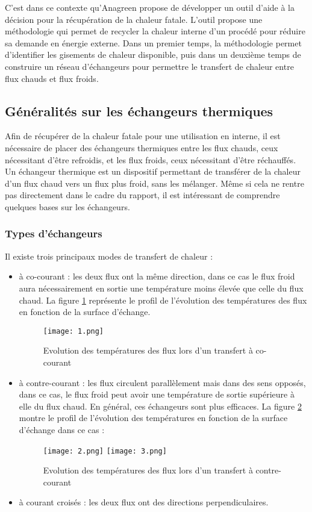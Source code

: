 C'est dans ce contexte qu'Anagreen propose de développer un outil d'aide à la décision pour la récupération de la chaleur fatale. L'outil propose une méthodologie qui permet de recycler la chaleur interne d'un procédé pour réduire sa demande en énergie externe. Dans un premier temps, la méthodologie permet d'identifier les gisements de chaleur disponible, puis dans un deuxième temps de construire un réseau d'échangeurs pour permettre le transfert de chaleur entre flux chauds et flux froids.

\subsection{Généralités sur les échangeurs thermiques}
Afin de récupérer de la chaleur fatale pour une utilisation en interne, il est nécessaire de
placer des échangeurs thermiques entre les flux chauds, ceux nécessitant d'être refroidis, et les flux froids, ceux nécessitant d'être réchauffés.
Un échangeur thermique est un dispositif permettant de transférer de la chaleur d'un flux chaud vers un flux plus froid, sans les mélanger. Même si cela ne rentre pas directement dans le cadre du rapport, il est intéressant de comprendre quelques bases sur les échangeurs.

\subsubsection{Types d'échangeurs}
Il existe trois principaux modes de transfert de chaleur : 
\begin{itemize}
\item à co-courant : les deux flux ont la même direction, dans ce cas le flux froid aura nécessairement en sortie une température moins élevée que celle du flux chaud. La figure \ref{evo1} représente le profil de l'évolution des températures des flux en fonction de la surface d'échange. 

\begin{figure}[!h]
\centering
\texttt{[image: 1.png]}
\caption{Evolution des températures des flux lors d'un transfert à co-courant}
\label{evo1}
\end{figure}

\item à contre-courant : les flux circulent parallèlement mais dans des sens opposés, dans ce cas, le flux froid peut avoir une température de sortie supérieure à elle du flux chaud. En général, ces échangeurs sont plus efficaces. La figure \ref{evo2} montre le profil de l'évolution des températures en fonction de la surface d'échange dans ce cas : 

\begin{figure}[!h]
\centering
\texttt{[image: 2.png]}
\texttt{[image: 3.png]}
\caption{Evolution des températures des flux lors d'un transfert à contre-courant}
\label{evo2}
\end{figure}

\item à courant croisés : les deux flux ont des directions perpendiculaires.
\end{itemize}

